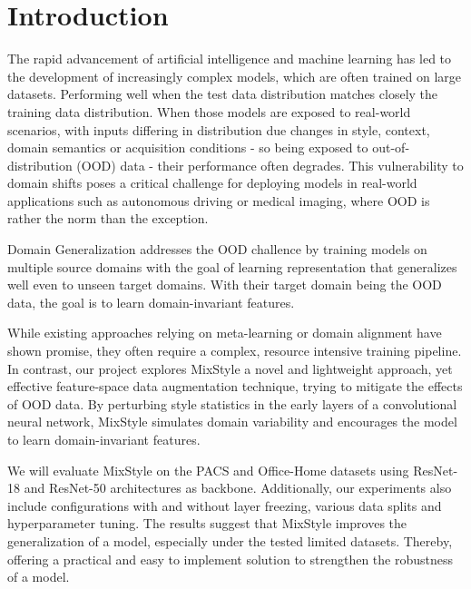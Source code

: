 \section{Introduction}

The rapid advancement of artificial intelligence and machine learning has led to the development of increasingly complex models, which are often trained on large datasets. Performing well when the test data distribution matches closely the training data distribution. When those models are exposed to real-world scenarios, with inputs differing in distribution due changes in style, context, domain semantics or acquisition conditions - so being exposed to out-of-distribution (OOD) data - their performance often degrades. This vulnerability to domain shifts poses a critical challenge for deploying models in real-world applications such as autonomous driving or medical imaging, where OOD is rather the norm than the exception.

Domain Generalization addresses the OOD challence by training models on multiple source domains with the goal of learning representation that generalizes well even to unseen target domains. With their target domain being the OOD data, the goal is to learn domain-invariant features.

While existing approaches relying on meta-learning or domain alignment have shown promise, they often require a complex, resource intensive training pipeline. In contrast, our project explores MixStyle \citep{zhouMixStyleNeuralNetworks2023} a novel and lightweight approach, yet effective feature-space data augmentation technique, trying to mitigate the effects of OOD data. By perturbing style statistics in the early layers of a convolutional neural network, MixStyle simulates domain variability and encourages the model to learn domain-invariant features.

We will evaluate MixStyle on the PACS and Office-Home datasets using ResNet-18 and ResNet-50 architectures as backbone. Additionally, our experiments also include configurations with and without layer freezing, various data splits and hyperparameter tuning. The results suggest that MixStyle improves the generalization of a model, especially under the tested limited datasets. Thereby, offering a practical and easy to implement solution to strengthen the robustness of a model.